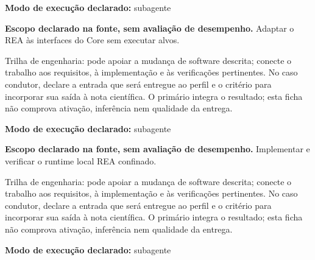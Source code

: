 \begin{arquitetura}
\textbf{Modo de execução declarado:} subagente
\end{arquitetura}


\begin{descricao}
\textbf{Escopo declarado na fonte, sem avaliação de desempenho.}
Adaptar o REA às interfaces do Core sem executar alvos.
\end{descricao}

\begin{funcao}
Trilha de engenharia: pode apoiar a mudança de software descrita; conecte o trabalho aos requisitos, à implementação e às verificações pertinentes. No caso condutor, declare a entrada que será entregue ao perfil e o critério para incorporar sua saída à nota científica. O primário integra o resultado; esta ficha não comprova ativação, inferência nem qualidade da entrega.
\end{funcao}

\begin{arquitetura}
\textbf{Modo de execução declarado:} subagente
\end{arquitetura}


\begin{descricao}
\textbf{Escopo declarado na fonte, sem avaliação de desempenho.}
Implementar e verificar o runtime local REA confinado.
\end{descricao}

\begin{funcao}
Trilha de engenharia: pode apoiar a mudança de software descrita; conecte o trabalho aos requisitos, à implementação e às verificações pertinentes. No caso condutor, declare a entrada que será entregue ao perfil e o critério para incorporar sua saída à nota científica. O primário integra o resultado; esta ficha não comprova ativação, inferência nem qualidade da entrega.
\end{funcao}

\begin{arquitetura}
\textbf{Modo de execução declarado:} subagente
\end{arquitetura}

